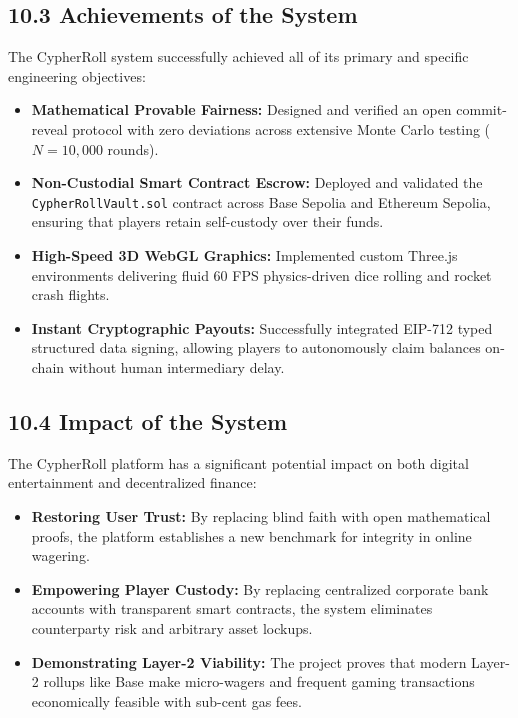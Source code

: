 \subsection*{10.3 Achievements of the System}
The CypherRoll system successfully achieved all of its primary and specific engineering objectives:
\begin{itemize}[leftmargin=1.5em]
    \item \textbf{Mathematical Provable Fairness:} Designed and verified an open commit-reveal protocol with zero deviations across extensive Monte Carlo testing ($N = 10,000$ rounds).
    \item \textbf{Non-Custodial Smart Contract Escrow:} Deployed and validated the \texttt{CypherRollVault.sol} contract across Base Sepolia and Ethereum Sepolia, ensuring that players retain self-custody over their funds.
    \item \textbf{High-Speed 3D WebGL Graphics:} Implemented custom Three.js environments delivering fluid 60 FPS physics-driven dice rolling and rocket crash flights.
    \item \textbf{Instant Cryptographic Payouts:} Successfully integrated EIP-712 typed structured data signing, allowing players to autonomously claim balances on-chain without human intermediary delay.
\end{itemize}

\subsection*{10.4 Impact of the System}
The CypherRoll platform has a significant potential impact on both digital entertainment and decentralized finance:
\begin{itemize}[leftmargin=1.5em]
    \item \textbf{Restoring User Trust:} By replacing blind faith with open mathematical proofs, the platform establishes a new benchmark for integrity in online wagering.
    \item \textbf{Empowering Player Custody:} By replacing centralized corporate bank accounts with transparent smart contracts, the system eliminates counterparty risk and arbitrary asset lockups.
    \item \textbf{Demonstrating Layer-2 Viability:} The project proves that modern Layer-2 rollups like Base make micro-wagers and frequent gaming transactions economically feasible with sub-cent gas fees.
\end{itemize}


